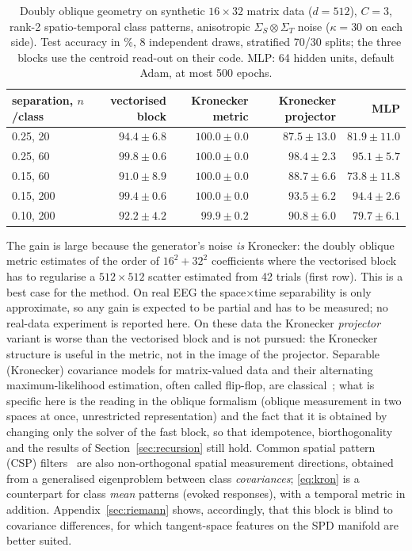 \documentclass[11pt,a4paper]{article}
\theoremstyle{plain}
\theoremstyle{definition}
\theoremstyle{remark}
\begin{document}
\begin{table}[h]
\centering\small\renewcommand{\arraystretch}{1.12}
\caption{Doubly oblique geometry on synthetic $16\times32$ matrix data ($d=512$), $C=3$, rank-2 spatio-temporal class patterns, anisotropic $\Sigma_S\otimes\Sigma_T$ noise ($\kappa=30$ on each side). Test accuracy in \%, 8 independent draws, stratified 70/30 splits; the three blocks use the centroid read-out on their code. MLP: 64 hidden units, default Adam, at most 500 epochs.}
\label{tab:kron}
\begin{tabular}{@{}lrrrr@{}}
\toprule
separation, $n$/class & vectorised block & Kronecker metric & Kronecker projector & MLP \\
\midrule
0.25, 20 & $94.4\pm6.8$ & $\mathbf{100.0\pm0.0}$ & $87.5\pm13.0$ & $81.9\pm11.0$ \\
0.25, 60 & $99.8\pm0.6$ & $\mathbf{100.0\pm0.0}$ & $98.4\pm2.3$ & $95.1\pm5.7$ \\
0.15, 60 & $91.0\pm8.9$ & $\mathbf{100.0\pm0.0}$ & $88.7\pm6.6$ & $73.8\pm11.8$ \\
0.15, 200 & $99.4\pm0.6$ & $\mathbf{100.0\pm0.0}$ & $93.5\pm6.2$ & $94.4\pm2.6$ \\
0.10, 200 & $92.2\pm4.2$ & $\mathbf{99.9\pm0.2}$ & $90.8\pm6.0$ & $79.7\pm6.1$ \\
\bottomrule
\end{tabular}
\end{table}
The gain is large because the generator's noise \emph{is} Kronecker: the
doubly oblique metric estimates of the order of $16^2+32^2$ coefficients
where the vectorised block has to regularise a $512\times512$ scatter
estimated from 42 trials (first row). This is a best case for the method. On
real EEG the space$\times$time separability is only approximate, so any gain
is expected to be partial and has to be measured; no real-data experiment is
reported here. On these data the Kronecker \emph{projector} variant is worse
than the vectorised block and is not pursued: the Kronecker structure is
useful in the metric, not in the image of the projector. Separable
(Kronecker) covariance models for matrix-valued data and their
alternating maximum-likelihood estimation, often called flip-flop, are
classical~\cite{dutilleul1999}; what is specific here is the reading in the
oblique formalism (oblique measurement in two spaces at once, unrestricted
representation) and the fact that it is obtained by changing only the
solver of the fast block, so that idempotence, biorthogonality and the
results of Section~\ref{sec:recursion} still hold. Common spatial pattern
(CSP) filters~\cite{blankertz2008csp} are also non-orthogonal spatial
measurement directions, obtained from a generalised eigenproblem between
class \emph{covariances}; \eqref{eq:kron} is a counterpart for class
\emph{mean} patterns (evoked responses), with a temporal metric in addition.
Appendix~\ref{sec:riemann} shows, accordingly, that this block is blind to
covariance differences, for which tangent-space features on the SPD manifold
are better suited.
\end{document}
